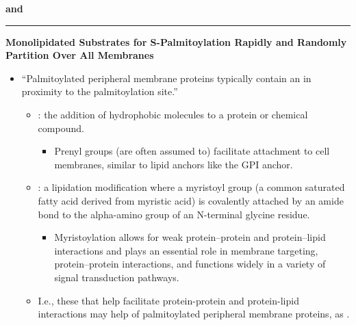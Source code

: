 \documentclass[basic,plain]{inVerba-notes}
\begin{document}
\begin{center}
  {\Large\textbf{ and }}
\end{center}

\hrule
\medskip

{\large\textbf{Monolipidated Substrates for S-Palmitoylation Rapidly and Randomly Partition Over All Membranes}}
\begin{itemize}
  \item ``Palmitoylated peripheral membrane proteins typically contain an  in proximity to the palmitoylation site.''
  \begin{itemize}
    \item {}: the addition of hydrophobic molecules to a protein or chemical compound.
      \begin{itemize}
        \item Prenyl groups (are often assumed to) facilitate attachment to cell membranes, similar to lipid anchors like the GPI anchor.
      \end{itemize}
    \item {}: a lipidation modification where a myristoyl group (a common saturated fatty acid derived from myristic acid) is covalently attached by an amide bond to the alpha-amino group of an N-terminal glycine residue.
    \begin{itemize}
      \item Myristoylation allows for weak protein–protein and protein–lipid interactions and plays an essential role in membrane targeting, protein–protein interactions, and functions widely in a variety of signal transduction pathways. 
    \end{itemize}
    \item I.e., these  that help facilitate protein-protein and protein-lipid interactions may help  of palmitoylated peripheral membrane proteins, as .
  \end{itemize}
\end{itemize}

\medskip 

\begin{center}
\end{center}
  
\end{document}
